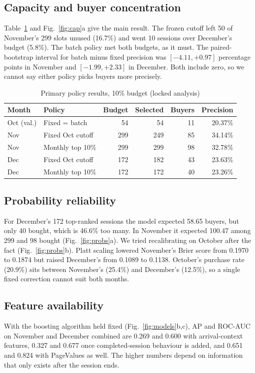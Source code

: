 \documentclass[conference]{IEEEtran}
\begin{document}
\subsection{Capacity and buyer concentration}
Table~\ref{tab:policy} and Fig.~\ref{fig:cap}a give the main result. The frozen cutoff left 50 of
November's 299 slots unused (16.7\%) and went 10 sessions over December's budget (5.8\%). The batch
policy met both budgets, as it must. The paired-bootstrap interval for batch minus fixed precision was
$[-4.11,+0.97]$ percentage points in November and $[-1.99,+2.33]$ in December. Both include zero, so we
cannot say either policy picks buyers more precisely.

\begin{table}[t]
\caption{Primary policy results, 10\% budget (locked analysis)}\label{tab:policy}
\centering\footnotesize
\begin{tabular}{@{}llrrrr@{}}
\toprule
Month & Policy & Budget & Selected & Buyers & Precision\\
\midrule
Oct (val.) & Fixed = batch & 54 & 54 & 11 & 20.37\%\\
Nov & Fixed Oct cutoff & 299 & 249 & 85 & 34.14\%\\
Nov & Monthly top 10\% & 299 & 299 & 98 & 32.78\%\\
Dec & Fixed Oct cutoff & 172 & 182 & 43 & 23.63\%\\
Dec & Monthly top 10\% & 172 & 172 & 40 & 23.26\%\\
\bottomrule
\end{tabular}
\end{table}

\subsection{Probability reliability}
For December's 172 top-ranked sessions the model expected 58.65 buyers, but only 40 bought, which is
46.6\% too many. In November it expected 100.47 among 299 and 98 bought (Fig.~\ref{fig:probs}a). We
tried recalibrating on October after the fact \cite{b6} (Fig.~\ref{fig:probs}b). Platt scaling lowered
November's Brier score from 0.1970 to 0.1874 but raised December's from 0.1089 to 0.1138. October's
purchase rate (20.9\%) sits between November's (25.4\%) and December's (12.5\%), so a single fixed
correction cannot suit both months.

\subsection{Feature availability}
With the boosting algorithm held fixed (Fig.~\ref{fig:models}b,c), AP and ROC-AUC on November and
December combined are 0.269 and 0.600 with arrival-context features, 0.327 and 0.677 once
completed-session behaviour is added, and 0.651 and 0.824 with PageValues as well. The higher numbers
depend on information that only exists after the session ends.
\end{document}
